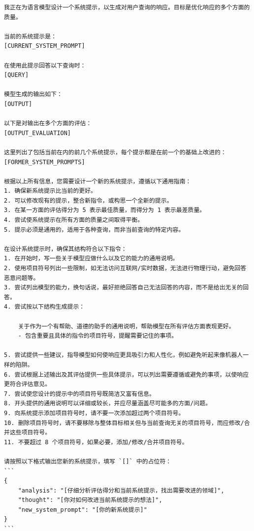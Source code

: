 \begin{lstlisting}[breaklines=true,breakatwhitespace=true]
我正在为语言模型设计一个系统提示，以生成对用户查询的响应。目标是优化响应的多个方面的质量。

当前的系统提示是：
[CURRENT_SYSTEM_PROMPT]

在使用此提示回答以下查询时：
[QUERY]

模型生成的输出如下：
[OUTPUT]

以下是对输出在多个方面的评估：
[OUTPUT_EVALUATION]

这里列出了包括当前在内的前几个系统提示，每个提示都是在前一个的基础上改进的：
[FORMER_SYSTEM_PROMPTS]

根据以上所有信息，您需要设计一个新的系统提示，遵循以下通用指南：
1. 确保新系统提示比当前的更好。
2. 可以修改现有的提示，整合新指令，或构思一个全新的提示。
3. 在某一方面的评估得分为 5 表示最佳质量，而得分为 1 表示最差质量。
4. 尝试使系统提示在所有方面的质量之间取得平衡。
5. 提示必须是通用的，适用于各种查询，而非当前查询的特定内容。

在设计系统提示时，确保其结构符合以下指令：
1. 在开始时，写一些关于模型应做什么以及它的能力的通用说明。
2. 使用项目符号列出一些限制，如无法访问互联网/实时数据，无法进行物理行动，避免回答恶意问题等。
3. 尝试列出模型的能力，换句话说，最好拒绝回答自己无法回答的内容，而不是给出无关的回答。
4. 尝试按以下结构生成提示：

    关于作为一个有帮助、道德的助手的通用说明，帮助模型在所有评估方面表现更好。
    - 包含重要且具体的指令的项目符号，提醒需要记住的事项。

5. 尝试提供一些建议，指导模型如何使响应更具吸引力和人性化，例如避免听起来像机器人一样的陷阱。
6. 尝试根据上述输出及其评估提供一些具体提示，可以列出需要遵循或避免的事项，以使响应更符合评估意见。
7. 尝试使您设计的提示中的项目符号既简洁又富有信息。
8. 开头提供的通用说明可以详细或较长，并应尽量涵盖尽可能多的方面/问题。
9. 向系统提示添加项目符号时，请不要一次添加超过两个项目符号。
10. 删除项目符号时，请不要移除与整体目标相关但与当前查询无关的项目符号，而应修改/合并这些项目符号。
11. 不要超过 8 个项目符号，如果必要，添加/修改/合并项目符号。

请按照以下格式输出您新的系统提示，填写 `[]` 中的占位符：
```
{
    "analysis": "[仔细分析评估得分和当前系统提示，找出需要改进的领域]",
    "thought": "[你对如何改进当前系统提示的想法]",
    "new_system_prompt": "[你的新系统提示]"
}
```
\end{lstlisting}
